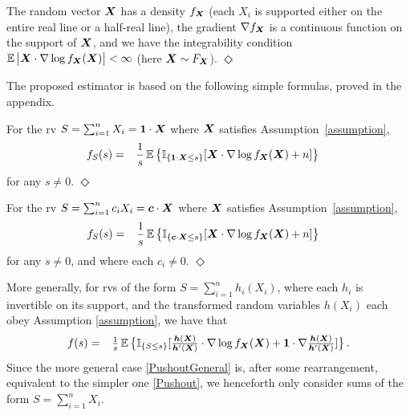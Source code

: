 \begin{assumption} \label{assumption}
The random vector $\boldsymbol{X}$ has a density $f_{\boldsymbol{X}}$  (each $X_i$ is supported either on the entire real line or a half-real line), the gradient $\nabla f_{\boldsymbol{X}}$ is a continuous function on the  support of $\boldsymbol{X}$, and we have the integrability condition
$
\mathbb{E}\left|\boldsymbol{X} \cdot \nabla \log f_{\boldsymbol{X}}(\boldsymbol{X})\right|<\infty 
$ (here $\boldsymbol{X}\sim F_{\boldsymbol{X}}$). \hfill $\Diamond$
\end{assumption}
The proposed estimator is based on the following  simple formulas, proved in the appendix. 
\begin{proposition} \label{prop:DensityRepresentation}
For the rv $S = \sum_{i=1}^n X_i = \boldsymbol{1} \cdot \boldsymbol{X}$ where $\boldsymbol{X}$ satisfies Assumption~\ref{assumption},
\begin{align} \label{Pushout}
f_S(s) &= \hphantom{-} \frac{1}{s} \operatorname{{\mathbb E}} \big\{ \mathbb{I}_{\{\boldsymbol{1} \cdot \boldsymbol{X} \le s \}} [ \boldsymbol{X} \cdot \nabla \log f_{\boldsymbol{X}}(\boldsymbol{X}) + n ] \big\} 
\end{align}
for any $s \not= 0$. \hfill $\Diamond$
\end{proposition}


\begin{corollary} \label{cor:WeightedSums}
For the rv $S = \sum_{i=1}^n c_i X_i = \boldsymbol{c} \cdot \boldsymbol{X}$
where $\boldsymbol{X}$ satisfies Assumption~\ref{assumption}, 
\begin{align} \label{PushoutWeighted}
f_S(s)
&= \hphantom{-} \frac{1}{s} \operatorname{{\mathbb E}} \big\{ \mathbb{I}_{\{\boldsymbol{c} \cdot \boldsymbol{X} \le s \}} [ \boldsymbol{X} \cdot \nabla \log f_{\boldsymbol{X}}(\boldsymbol{X}) + n ] \big\} 
\end{align}
for any $s \not= 0$, and where each $c_i \not=0$. \hfill $\Diamond$
\end{corollary}

More generally, for rvs of the form $S = \sum_{i=1}^n h_i(X_i)$, where each $h_i$ is invertible on its support, and the transformed random variables $h(X_i)$ each obey Assumption \ref{assumption}, we have that
\begin{equation} \label{PushoutGeneral} 
\textstyle
f(s) = \hphantom{-} \frac{1}{s} \operatorname{{\mathbb E}}\big\{ \mathbb{I}_{\{S \le s \}} [ \frac{\boldsymbol{h}(\boldsymbol{X})}{\boldsymbol{h}'(\boldsymbol{X})} \cdot \nabla \log f_{\boldsymbol{X}}(\boldsymbol{X}) + \boldsymbol{1} \cdot \nabla \frac{\boldsymbol{h}(\boldsymbol{X})}{\boldsymbol{h}'(\boldsymbol{X})} ] \big\} \,. 
\end{equation}
Since the more general  case \eqref{PushoutGeneral} is, after some rearrangement, equivalent to the simpler one  \eqref{Pushout},  we henceforth only consider  sums of the form $S = \sum_{i=1}^n X_i$.



